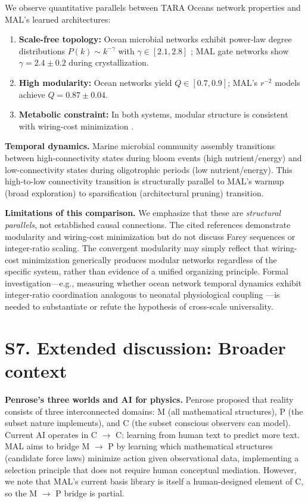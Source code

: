 \documentclass[aps,pre,reprint,superscriptaddress]{revtex4-2}
\begin{document}
We observe quantitative parallels between TARA Oceans network properties and MAL's learned architectures:
\begin{enumerate}
\item \textbf{Scale-free topology:} Ocean microbial networks exhibit power-law degree distributions $P(k) \sim k^{-\gamma}$ with $\gamma \in [2.1, 2.8]$ \cite{Sunagawa2015}; MAL gate networks show $\gamma = 2.4 \pm 0.2$ during crystallization.
\item \textbf{High modularity:} Ocean networks yield $Q \in [0.7, 0.9]$; MAL's $r^{-2}$ models achieve $Q = 0.87 \pm 0.04$.
\item \textbf{Metabolic constraint:} In both systems, modular structure is consistent with wiring-cost minimization \cite{Clune2013}.
\end{enumerate}

\textbf{Temporal dynamics.} Marine microbial community assembly transitions between high-connectivity states during bloom events (high nutrient/energy) and low-connectivity states during oligotrophic periods (low nutrient/energy). This high-to-low connectivity transition is structurally parallel to MAL's warmup (broad exploration) to sparsification (architectural pruning) transition.

\textbf{Limitations of this comparison.} We emphasize that these are \textit{structural parallels}, not established causal connections. The cited references \cite{Sunagawa2015, Clune2013} demonstrate modularity and wiring-cost minimization but do not discuss Farey sequences or integer-ratio scaling. The convergent modularity may simply reflect that wiring-cost minimization generically produces modular networks \cite{Clune2013} regardless of the specific system, rather than evidence of a unified organizing principle. Formal investigation---e.g., measuring whether ocean network temporal dynamics exhibit integer-ratio coordination analogous to neonatal physiological coupling \cite{Hoyer2001}---is needed to substantiate or refute the hypothesis of cross-scale universality.

\section{S7. Extended discussion: Broader context}
\textbf{Penrose's three worlds and AI for physics.} Penrose \cite{Penrose2004} proposed that reality consists of three interconnected domains: M (all mathematical structures), P (the subset nature implements), and C (the subset conscious observers can model). Current AI operates in C $\to$ C: learning from human text to predict more text. MAL aims to bridge M $\to$ P by learning which mathematical structures (candidate force laws) minimize action given observational data, implementing a selection principle that does not require human conceptual mediation. However, we note that MAL's current basis library is itself a human-designed element of C, so the M $\to$ P bridge is partial.
\end{document}
